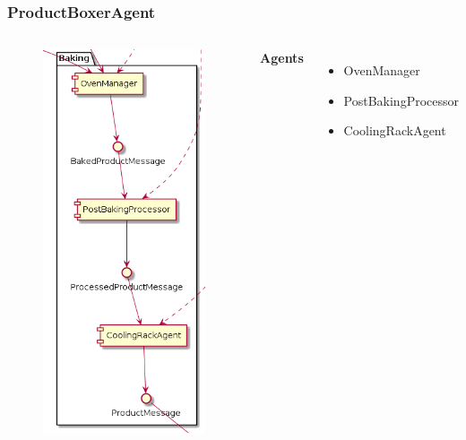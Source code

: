 \documentclass{beamer}
\begin{document}
\begin{frame}
    \frametitle{\huge{ProductBoxerAgent}}
    \begin{columns}[t]
        \begin{figure}[H]
            \centering
            \includegraphics[width=0.6\linewidth]{baking_component_diagram.png}
        \end{figure}
            \textbf{Agents}
            \begin{itemize}
                \item OvenManager
                \item PostBakingProcessor
                \item CoolingRackAgent
            \end{itemize}
    \end{columns}
\end{frame}
\end{document}
